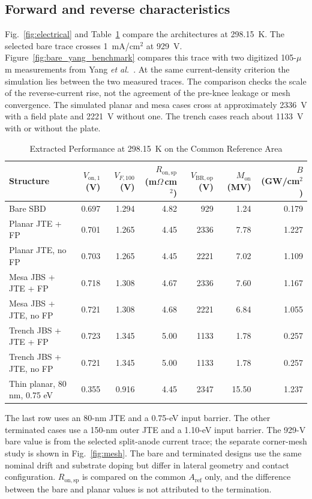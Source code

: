 \documentclass[journal,10pt]{IEEEtran}
\newcommand{\Vop}{\ensuremath{V_{\mathrm{BR,op}}}}
\newcommand{\Von}{\ensuremath{V_{\mathrm{on},1}}}
\newcommand{\Ron}{\ensuremath{R_{\mathrm{on,sp}}}}
\begin{document}
\subsection{Forward and reverse characteristics}
Fig.~\ref{fig:electrical} and Table~\ref{tab:architectures} compare the architectures at 298.15~K. The selected bare trace crosses 1~mA/cm$^2$ at 929~V. Figure~\ref{fig:bare_yang_benchmark} compares this trace with two digitized 105-$\mu$m measurements from Yang \emph{et al.}~\cite{Yang2017}. At the same current-density criterion the simulation lies between the two measured traces. The comparison checks the scale of the reverse-current rise, not the agreement of the pre-knee leakage or mesh convergence. The simulated planar and mesa cases cross at approximately 2336~V with a field plate and 2221~V without one. The trench cases reach about 1133~V with or without the plate.

\begin{table}[!t]
\caption{Extracted Performance at 298.15~K on the Common Reference Area}
\label{tab:architectures}
\centering\footnotesize
\begin{tabular}{lrrrrrr}
\toprule
Structure & $\Von$ (V) & $V_{F,100}$ (V) & $\Ron$ (m$\Omega$\,cm$^2$) & $\Vop$ (V) & $M_{\mathrm{on}}$ (MV) & $B$ (GW/cm$^2$)\\
\midrule
Bare SBD & 0.697 & 1.294 & 4.82 & 929 & 1.24 & 0.179\\
Planar JTE + FP & 0.701 & 1.265 & 4.45 & 2336 & 7.78 & 1.227\\
Planar JTE, no FP & 0.703 & 1.265 & 4.45 & 2221 & 7.02 & 1.109\\
Mesa JBS + JTE + FP & 0.718 & 1.308 & 4.67 & 2336 & 7.60 & 1.167\\
Mesa JBS + JTE, no FP & 0.721 & 1.308 & 4.68 & 2221 & 6.84 & 1.055\\
Trench JBS + JTE + FP & 0.723 & 1.345 & 5.00 & 1133 & 1.78 & 0.257\\
Trench JBS + JTE, no FP & 0.721 & 1.345 & 5.00 & 1133 & 1.78 & 0.257\\
Thin planar, 80 nm, 0.75 eV & 0.355 & 0.916 & 4.45 & 2347 & 15.50 & 1.237\\
\bottomrule
\end{tabular}
\par\smallskip\begin{minipage}{0.96\textwidth}\footnotesize
The last row uses an 80-nm JTE and a 0.75-eV input barrier. The other terminated cases use a 150-nm outer JTE and a 1.10-eV input barrier. The 929-V bare value is from the selected split-anode current trace; the separate corner-mesh study is shown in Fig.~\ref{fig:mesh}. The bare and terminated designs use the same nominal drift and substrate doping but differ in lateral geometry and contact configuration. $R_{\mathrm{on,sp}}$ is compared on the common $A_{\mathrm{ref}}$ only, and the difference between the bare and planar values is not attributed to the termination.
\end{minipage}
\end{table}
\end{document}
